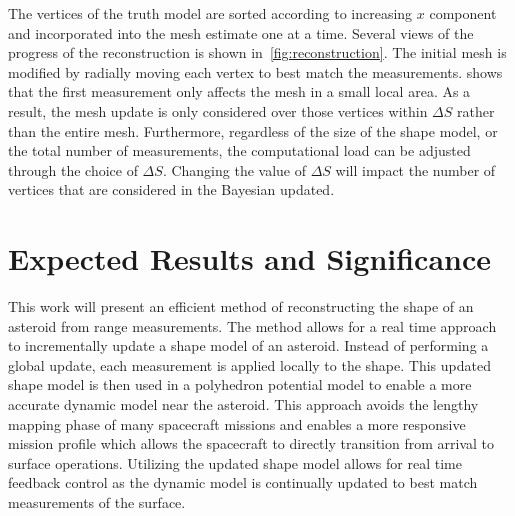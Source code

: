 \documentclass[letterpaper, paper,11pt]{AAS}		%
\begin{document}
The vertices of the truth model are sorted according to increasing \( x \) component and incorporated into the mesh estimate one at a time. 
Several views of the progress of the reconstruction is shown in~\cref{fig:reconstruction}.
The initial mesh is modified by radially moving each vertex to best match the measurements.
 shows that the first measurement only affects the mesh in a small local area.
As a result, the mesh update is only considered over those vertices within \( \Delta S \) rather than the entire mesh. 
Furthermore, regardless of the size of the shape model, or the total number of measurements, the computational load can be adjusted through the choice of \( \Delta S \).
Changing the value of \( \Delta S \) will impact the number of vertices that are considered in the Bayesian updated.

\section{Expected Results and Significance}
This work will present an efficient method of reconstructing the shape of an asteroid from range measurements. 
The method allows for a real time approach to incrementally update a shape model of an asteroid.
Instead of performing a global update, each measurement is applied locally to the shape. 
This updated shape model is then used in a polyhedron potential model to enable a more accurate dynamic model near the asteroid.
This approach avoids the lengthy mapping phase of many spacecraft missions and enables a more responsive mission profile which allows the spacecraft to directly transition from arrival to surface operations.
Utilizing the updated shape model allows for real time feedback control as the dynamic model is continually updated to best match measurements of the surface.

 

\end{document}
